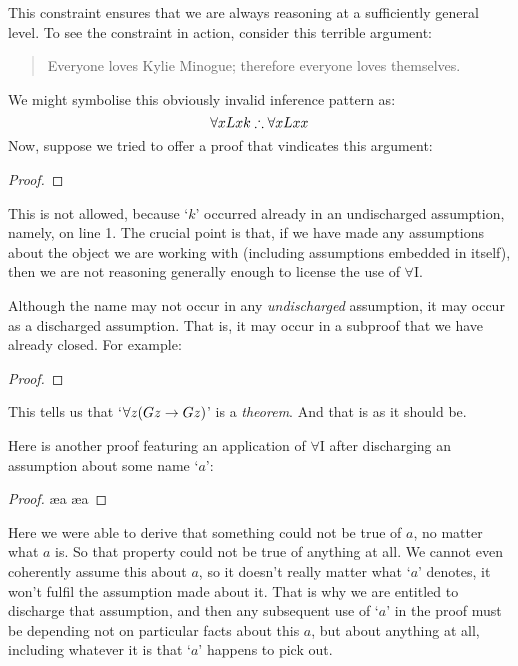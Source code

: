  This constraint ensures that we are always reasoning at a sufficiently general level. To see the constraint in action, consider this terrible argument:
	\begin{quote}
		Everyone loves Kylie Minogue; therefore everyone loves themselves.
	\end{quote}
We might symbolise this obviously invalid inference pattern as:
$$\forall x Lxk \mathrel{\therefore} \forall x Lxx$$
Now, suppose we tried to offer a proof that vindicates this argument:
\begin{proof}
	 
	 
\end{proof}\noindent
This is not allowed, because `$k$' occurred already in an undischarged assumption, namely, on line 1. The crucial point is that, if we have made any assumptions about the object we are working with (including assumptions embedded in  itself), then we are not reasoning generally enough to license  the use of $\forall$I.

Although the name may not occur in any \emph{undischarged} assumption, it may occur as a discharged assumption. That is, it may occur in a subproof that we have already closed. For example:
\begin{proof}
	\open
	\close
\end{proof}
This tells us that `$\forall z (Gz \rightarrow Gz)$' is a \emph{theorem}. And that is as it should be. 

Here is another proof featuring an application of $\forall$I after discharging an assumption about some name `$a$':
\begin{proof}
	\open
	\ae{a}
	\ae{a}
	\close
\end{proof} Here we were able to derive that something could not be true of $a$, no matter what $a$ is. So that property could not be true of anything at all. We cannot even coherently assume this about $a$, so it doesn't really matter what `$a$' denotes, it won't fulfil the assumption made about it. That is why we are entitled to discharge that assumption, and then any subsequent use of `$a$' in the proof must be depending not on particular facts about this $a$, but about anything at all, including whatever it is that `$a$' happens to pick out.

